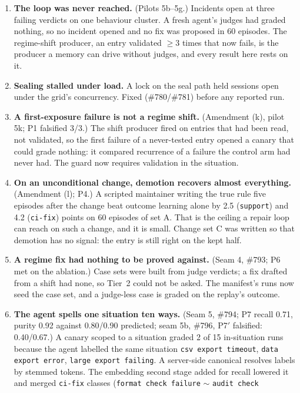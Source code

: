 \documentclass[11pt]{article}
\newcommand{\code}[1]{\texttt{#1}}
\begin{document}
\begin{enumerate}[leftmargin=1.6em, itemsep=0.35em]
\item \textbf{The loop was never reached.} (Pilots 5b--5g.) Incidents open at three failing
verdicts on one behaviour cluster. A fresh agent's judges had graded nothing, so no incident
opened and no fix was proposed in 60 episodes. The regime-shift producer, an entry validated
$\geq 3$ times that now fails, is the producer a memory can drive without judges, and every
result here rests on it.
\item \textbf{Sealing stalled under load.} A lock on the seal path held sessions open under the
grid's concurrency. Fixed (\#780/\#781) before any reported run.
\item \textbf{A first-exposure failure is not a regime shift.} (Amendment (k), pilot 5k; P1
falsified 3/3.) The shift producer fired on entries that had been read, not validated, so the
first failure of a never-tested entry opened a canary that could grade nothing: it compared
recurrence of a failure the control arm had never had. The guard now requires validation in the
situation.
\item \textbf{On an unconditional change, demotion recovers almost everything.} (Amendment (l);
P4.) A scripted maintainer writing the true rule five episodes after the change beat outcome
learning alone by 2.5 (\code{support}) and 4.2 (\code{ci-fix}) points on 60 episodes of set A.
That is the ceiling a repair loop can reach on such a change, and it is small. Change set C was
written so that demotion has no signal: the entry is still right on the kept half.
\item \textbf{A regime fix had nothing to be proved against.} (Seam 4, \#793; P6 met on the
ablation.) Case sets were built from judge verdicts; a fix drafted from a shift had none, so
Tier~2 could not be asked. The manifest's runs now seed the case set, and a judge-less case is
graded on the replay's outcome.
\item \textbf{The agent spells one situation ten ways.} (Seam 5, \#794; P7 recall 0.71, purity
0.92 against 0.80/0.90 predicted; seam 5b, \#796, P7$'$ falsified: 0.40/0.67.) A canary scoped
to a situation graded 2 of 15 in-situation runs because the agent labelled the same situation
\code{csv export timeout}, \code{data export error}, \code{large export failing}. A server-side
canonical resolves labels by stemmed tokens. The embedding second stage added for recall lowered
it and merged \code{ci-fix} classes (\code{format check failure} $\sim$ \code{audit check
}
\end{enumerate}
\end{document}
